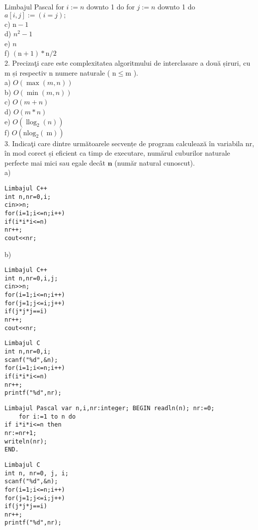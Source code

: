Limbajul Pascal for $i:=n$ downto 1 do for $j:=n$ downto 1 do\\
$a[i, j]:=(i=j) ;$\\
c) $\mathrm{n}-1$\\
d) $n^{2}-1$\\
e) $n$\\
f) $(\mathrm{n}+1) * \mathrm{n} / 2$\\
2. Precizaţi care este complexitatea algoritmului de interclasare a două șiruri, cu m și respectiv n numere naturale ( $\mathrm{n} \leq \mathrm{m}$ ).\\
a) $O(\max (m, n))$\\
b) $O(\min (m, n))$\\
c) $O(m+n)$\\
d) $O(m * n)$\\
e) $O\left(\operatorname{llog}_{2}(n)\right)$\\
f) $O\left(\mathrm{nlog}_{2}(\mathrm{~m})\right)$\\
3. Indicaţi care dintre următoarele secvențe de program calculează în variabila nr, în mod corect și eficient ca timp de executare, numărul cuburilor naturale perfecte mai mici sau egale decât $\mathbf{n}$ (număr natural cunoscut).\\
a)

\begin{verbatim}
Limbajul C++
int n,nr=0,i;
cin>>n;
for(i=1;i<=n;i++)
if(i*i*i<=n)
nr++;
cout<<nr;
\end{verbatim}

b)

\begin{verbatim}
Limbajul C++
int n,nr=0,i,j;
cin>>n;
for(i=1;i<=n;i++)
for(j=1;j<=i;j++)
if(j*j*j==i)
nr++;
cout<<nr;
\end{verbatim}

\begin{verbatim}
Limbajul C
int n,nr=0,i;
scanf("%d",&n);
for(i=1;i<=n;i++)
if(i*i*i<=n)
nr++;
printf("%d",nr);
\end{verbatim}

\begin{verbatim}
Limbajul Pascal var n,i,nr:integer; BEGIN readln(n); nr:=0;
    for i:=1 to n do
if i*i*i<=n then
nr:=nr+1;
writeln(nr);
END.
\end{verbatim}

\begin{verbatim}
Limbajul C
int n, nr=0, j, i;
scanf("%d",&n);
for(i=1;i<=n;i++)
for(j=1;j<=i;j++)
if(j*j*j==i)
nr++;
printf("%d",nr);
\end{verbatim}

